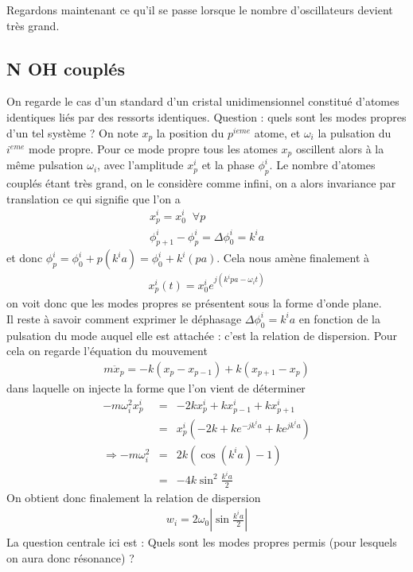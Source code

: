 \documentclass[12pt,prb,aps,epsf]{article}
\begin{document}
Regardons maintenant ce qu'il se passe lorsque le nombre d'oscillateurs devient très grand. 

\subsection{N OH couplés}
On regarde le cas d'un standard d'un cristal unidimensionnel constitué d'atomes identiques liés par des ressorts identiques. Question : quels sont les modes propres d'un tel système ? On note $x_p$ la position du $p^{ieme}$ atome, et $\omega_i$ la pulsation du $i^{eme}$ mode propre. Pour ce mode propre tous les atomes $x_p$ oscillent alors à la même pulsation $\omega_i$, avec l'amplitude $x_p^i$ et la phase $\phi_p^i$. Le nombre d'atomes couplés étant très grand, on le considère comme infini, on a alors invariance par translation ce qui signifie que l'on a 
\begin{eqnarray}
x_p^i = x_0^i\;\; \forall p\\
\phi^i_{p+1} - \phi^i_p = \Delta \phi_0^i = k^ia
\end{eqnarray}
et donc $\phi_p^i = \phi_0^i + p(k^ia) = \phi_0^i + k^i(pa)$. Cela nous amène finalement à 
\begin{eqnarray}
x_p^i(t) = x_0^i e^{j(k^ipa - \omega_i t)}
\end{eqnarray}
on voit donc que les modes propres se présentent sous la forme d'onde plane.\\
Il reste à savoir comment exprimer le déphasage $\Delta \phi_0^i=k^ia$ en fonction de la pulsation du mode auquel elle est attachée : c'est la relation de dispersion. Pour cela on regarde l'équation du mouvement 
\begin{eqnarray}
m\ddot{x}_p = -k(x_p-x_{p-1}) + k(x_{p+1}-x_p)
\end{eqnarray}
dans laquelle on injecte la forme que l'on vient de déterminer 
\begin{eqnarray}
-m\omega_i^2x_p^i &=& - 2kx_p^i + k x_{p-1}^i + k x_{p+1}^i \\
&=& x_p^i (-2k + k e^{-jk^ia} + ke^{jk^ia})\\
\Rightarrow -m\omega_i^2 &=& 2k (\cos(k^ia)-1)\\
&=& -4k\sin^2\frac{k^ia}{2}
\end{eqnarray}
On obtient donc finalement la relation de dispersion
\begin{eqnarray}
w_i = 2\omega_0 \left|\sin\frac{k^ia}{2}\right|
\end{eqnarray}
 La question centrale ici est : Quels sont les modes propres permis (pour lesquels on aura donc résonance) ?\\
 
\end{document}
